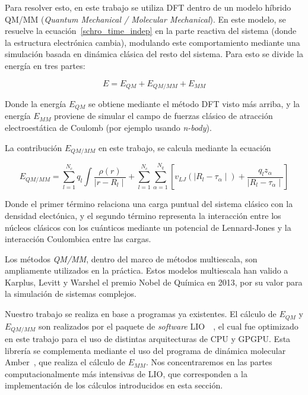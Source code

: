 Para resolver esto, en este trabajo se utiliza DFT dentro de un modelo h\'ibrido QM/MM (\textit{Quantum Mechanical / Molecular Mechanical}).
En este modelo, se resuelve la ecuaci\'on~\ref{schro_time_indep} en la parte reactiva del sistema (donde la estructura
electr\'onica cambia), modulando este comportamiento mediante una simulaci\'on basada en din\'amica
cl\'asica del resto del sistema. Para esto se divide la energ\'ia en tres partes:

\begin{equation}
    E = E_{QM} + E_{QM/MM} + E_{MM}
\end{equation}

Donde la energ\'ia $E_{QM}$ se obtiene mediante el m\'etodo DFT visto m\'as arriba, y la energ\'ia
$E_{MM}$ proviene de simular el campo de fuerzas cl\'asico de atracci\'on electroest\'atica de
Coulomb (por ejemplo usando \textit{n-body}).

La contribuci\'on $E_{QM/MM}$ en este trabajo, se calcula mediante la ecuaci\'on

\begin{equation}
    E_{QM/MM} = \sum_{l = 1}^{N_c} q_l \int \frac{\rho(r)}{\mid r - R_l \mid} + \sum_{l = 1}^{N_c}\sum_{\alpha = 1}^{N_q} [ v_{LJ} ( \mid R_l - \tau_\alpha \mid ) + \frac{q_l z_\alpha}{\mid R_l - \tau_\alpha \mid} ]
\end{equation}

Donde el primer t\'ermino relaciona una carga puntual del sistema cl\'asico con la densidad
elect\'onica, y el segundo t\'ermino representa la interacci\'on entre los n\'ucleos cl\'asicos
con los cu\'anticos mediante un potencial de Lennard-Jones y la interacci\'on Coulombica entre
las cargas.

Los m\'etodos \textit{QM/MM}, dentro del marco de m\'etodos multiescala, son ampliamente utilizados en
la pr\'actica. Estos modelos multiescala han valido a Karplus, Levitt y
Warshel el premio Nobel de Qu\'imica en 2013, por su valor para la simulaci\'on de sistemas complejos.

Nuestro trabajo se realiza en base a programas ya existentes. El c\'alculo de $E_{QM}$ y $E_{QM/MM}$ son realizados por el paquete de
\textit{software} LIO~\cite{LIO}~\cite{TesisNitsche}, el cual fue optimizado en este trabajo para el uso de
distintas arquitecturas de CPU y GPGPU. Esta librer\'ia
se complementa mediante el uso del programa de din\'amica molecular Amber~\cite{Amber}, que realiza el c\'alculo
de $E_{MM}$. Nos concentraremos en las partes computacionalmente m\'as intensivas de LIO, que corresponden a la
implementaci\'on de los c\'alculos introducidos en esta secci\'on.

